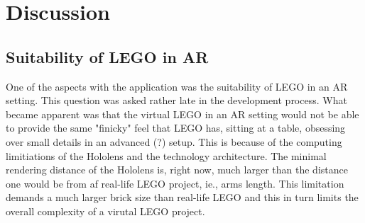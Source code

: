 
\section{Discussion}
\subsection{Suitability of LEGO in AR}
One of the aspects with the application was the suitability of LEGO in an AR setting. This question was asked rather late in the development process. What became apparent was that the virtual LEGO in an AR setting would not be able to provide the same "finicky" feel that LEGO has, sitting at a table, obsessing over small details in an advanced (?) setup. This is because of the computing limitiations of the Hololens and the technology architecture. The minimal rendering distance of the Hololens is, right now, much larger than the distance one would be from af real-life LEGO project, ie., arms length. This limitation demands a much larger brick size than real-life LEGO and this in turn limits the overall complexity of a virutal LEGO project. 